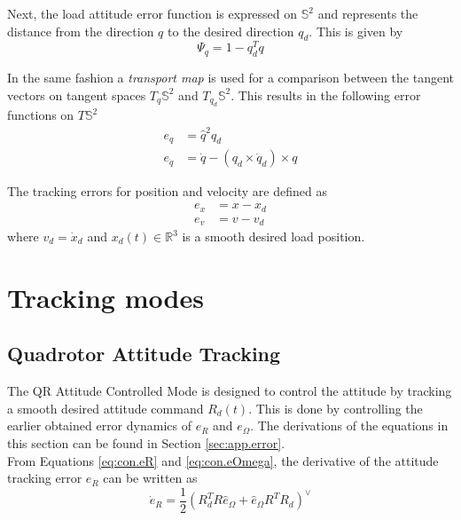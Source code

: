 Next, the load attitude error function is expressed on $ \mathbb{S}^2 $ and represents the distance from the direction $ q $ to the desired direction $ q_d $. 
This is given by 
\begin{equation}\label{eq:psiq}
\Psi_q=1-q_d^Tq
\end{equation}

In the same fashion a \textit{transport map} is used for a comparison between the tangent vectors on tangent spaces $ T_q\mathbb{S}^2$ and $ T_{q_d}\mathbb{S}^2$. This results in the following error functions on $ T\mathbb{S}^2 $
\begin{align}
e_q&=\hat{q}^2q_d\label{eq:con.eq}\\
e_{\dot{q}}&=\dot{q}-(q_d\times\dot{q}_d)\times q\label{eq:con.edq}
\end{align}

The tracking errors for position and velocity are defined as
\begin{align}\label{key}
e_x&=x-x_d\\
e_v&=v-v_d
\end{align}
where $ v_d=\dot{x}_d $ and $ x_d(t) \in \mathbb{R}^3$ is a smooth desired load position.

\section{Tracking modes}\label{sec:con.track}
\subsection{Quadrotor Attitude Tracking}\label{sec:con.qratt}
The QR Attitude Controlled Mode is designed to control the  attitude by tracking a smooth desired  attitude command $ R_d(t) $.
This is done by controlling the earlier obtained error dynamics of $ e_R $ and $ e_\Omega $. The derivations of the equations in this section can be found in Section \ref{sec:app.error}.\\
From Equations \ref{eq:con.eR} and \ref{eq:con.eOmega}, the derivative of the attitude tracking error $ e_R $ can be written as
\begin{equation}\label{key}
\dot{e}_R=\frac{1}{2}(R_d^TR\hat{e}_\Omega+\hat{e}_\Omega R^TR_d)^\vee
\end{equation}

